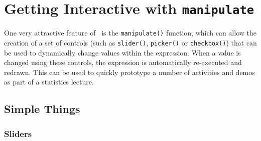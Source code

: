 





\chapter{Getting Interactive with \texttt{manipulate}}

One very attractive feature of \RStudio\ is the \verb!manipulate()! function, which
can allow the creation of a set of controls (such as \verb!slider()!, \verb!picker()!
or \verb!checkbox()!) that can be used to dynamically change values within the 
expression.  When a value is changed using these controls, the expression is automatically
re-executed and redrawn.  This can be used to quickly prototype a number of activities and
demos as part of a statistics lecture.

\section{Simple Things}

\subsection{Sliders}


\begin{knitrout}
\end{knitrout}

